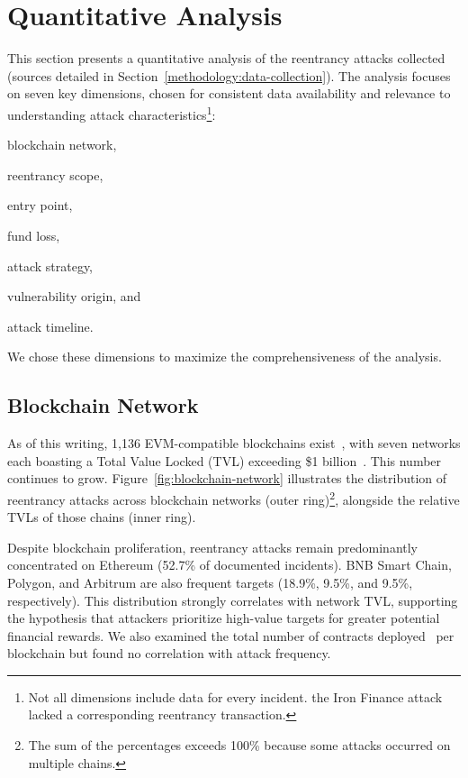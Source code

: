 \section{Quantitative Analysis}

This section presents a quantitative analysis of the \ReentrancyTotalAnalyzed{} reentrancy attacks collected (sources detailed in Section~\ref{methodology:data-collection}). The analysis focuses on seven key dimensions, chosen for consistent data availability and relevance to understanding attack characteristics\footnote{Not all dimensions include data for every incident. \eg the Iron Finance attack~\cite{attack-report:iron-finance} lacked a corresponding reentrancy transaction.}:
\begin{enumerate*}
    \item blockchain network,
    \item reentrancy scope,
    \item entry point,
    \item fund loss,
    \item attack strategy,
    \item vulnerability origin, and
    \item attack timeline.
\end{enumerate*}
We chose these dimensions to maximize the comprehensiveness of the analysis. 


\subsection{Blockchain Network}
\label{quantitative:blockchain-network}

As of this writing, 1,136 EVM-compatible blockchains exist~\cite{chainlist}, with seven networks each boasting a Total Value Locked (TVL) exceeding \$1 billion~\cite{coingecko}. This number continues to grow. Figure~\ref{fig:blockchain-network} illustrates the distribution of reentrancy attacks across blockchain networks (outer ring)\footnote{The sum of the percentages exceeds 100\% because some attacks occurred on multiple chains.}, alongside the relative TVLs of those chains (inner ring).

Despite blockchain proliferation, reentrancy attacks remain predominantly concentrated on Ethereum (52.7\% of documented incidents). BNB Smart Chain, Polygon, and Arbitrum are also frequent targets (18.9\%, 9.5\%, and 9.5\%, respectively). This distribution strongly correlates with network TVL, supporting the hypothesis that attackers prioritize high-value targets for greater potential financial rewards. We also examined the total number of contracts deployed~\cite{contracts-deployment-stats} per blockchain but found no correlation with attack frequency.

